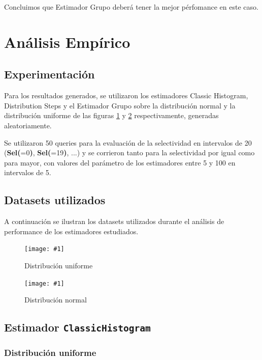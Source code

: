 \documentclass[a4paper, 10pt, twoside]{article}
\newcommand{\grafico}[3]{
  \begin{figure}[H]
    \texttt{[image: \#1]}
    \caption{#2}
    \label{#3}
  \end{figure}
}
\begin{document}
Concluimos que Estimador Grupo deberá tener la mejor pérfomance en este caso.




\section{Análisis Empírico}

\subsection{Experimentación}
Para los resultados generados, se utilizaron los estimadores Classic Histogram, Distribution Steps y el Estimador Grupo 
sobre la distribución normal y la distribución uniforme de las figuras \ref{custom-dataset-uniform} y 
\ref{custom-dataset-normal} respectivamente, generadas aleatoriamente. 

Se utilizaron 50 queries para la evaluación de la selectividad en intervalos de 20 (\textbf{Sel(}=0\textbf{)}, \textbf{Sel(}=19\textbf{)}, ...) y se corrieron tanto para la selectividad por igual como para mayor, con valores del parámetro de los estimadores entre 5 y 100 en intervalos de 5.

\subsection{Datasets utilizados}

A continuación se ilustran los datasets utilizados durante el análisis de performance de los estimadores estudiados.

\grafico{custom-dataset-uniform}
        {Distribución uniforme}
        {custom-dataset-uniform}

\grafico{custom-dataset-normal}
        {Distribución normal}
        {custom-dataset-normal}


\subsection{Estimador \texttt{ClassicHistogram}}

\subsubsection{Distribución uniforme}
\end{document}
